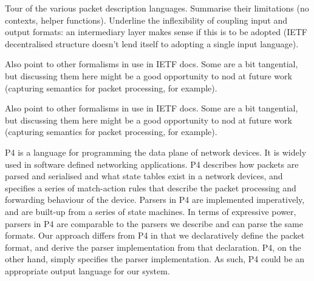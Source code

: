 \documentclass[10pt,sigconf]{acmart}
\begin{document}
%
% 

Tour of the various packet description languages. Summarise their limitations (no
contexts, helper functions). Underline the inflexibility of coupling input and output
formats: an intermediary layer makes sense if this is to be adopted (IETF decentralised
structure doesn't lend itself to adopting a single input language).

Also point to other formalisms in use in IETF docs. Some are a bit tangential, but
discussing them here might be a good opportunity to nod at future work (capturing
semantics for packet processing, for example).

Also point to other formalisms in use in IETF docs. Some are a bit tangential, but
discussing them here might be a good opportunity to nod at future work (capturing
semantics for packet processing, for example).

\cite{mccann2000packet}

P4 \cite{bosshart:2014:p4,p4consortium:2018:v16spec-20180531} is a language
for programming the data plane of network devices. It is widely used in
software defined networking applications.
P4 describes how packets are parsed and serialised and what state tables
exist in a network devices, and specifies a series of match-action rules
that describe the packet processing and forwarding behaviour of the device.
Parsers in P4 are implemented imperatively, and are built-up from a series
of state machines.
In terms of expressive power, parsers in P4 are comparable to the parsers
we describe and can parse the same formats.
Our approach differs from P4 in that we declaratively define the packet
format, and derive the parser implementation from that declaration. P4,
on the other hand, simply specifies the parser implementation. As such,
P4 could be an appropriate output language for our system.
\end{document}

